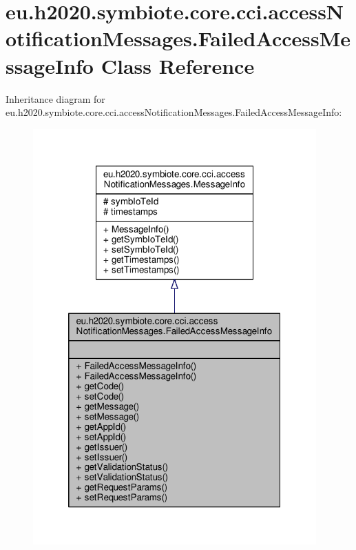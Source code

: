 \hypertarget{classeu_1_1h2020_1_1symbiote_1_1core_1_1cci_1_1accessNotificationMessages_1_1FailedAccessMessageInfo}{}\section{eu.\+h2020.\+symbiote.\+core.\+cci.\+access\+Notification\+Messages.\+Failed\+Access\+Message\+Info Class Reference}
\label{classeu_1_1h2020_1_1symbiote_1_1core_1_1cci_1_1accessNotificationMessages_1_1FailedAccessMessageInfo}


Inheritance diagram for eu.\+h2020.\+symbiote.\+core.\+cci.\+access\+Notification\+Messages.\+Failed\+Access\+Message\+Info\+:
\nopagebreak
\begin{figure}[H]
\begin{center}
\leavevmode
\includegraphics[width=308pt]{classeu_1_1h2020_1_1symbiote_1_1core_1_1cci_1_1accessNotificationMessages_1_1FailedAccessMessageInfo__inherit__graph}
\end{center}
\end{figure}


